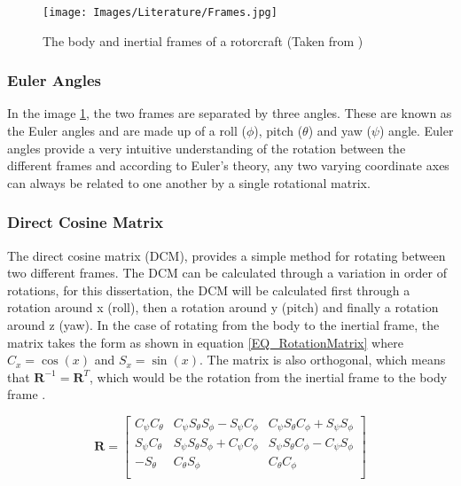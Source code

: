 		\begin{figure}[H]
			\centering
			\texttt{[image: Images/Literature/Frames.jpg]}     
			\caption{The body and inertial frames of a rotorcraft (Taken from \cite{Luukkonen})}
			\label{IM_Frames}
		\end{figure}
			
		\subsubsection{Euler Angles}	
		In the image \ref{IM_Frames}, the two frames are separated by three angles. These are known as the Euler angles and are made up of a roll ($\phi$), pitch ($\theta$) and yaw ($\psi$) angle. Euler angles provide a very intuitive understanding of the rotation between the different frames and according to Euler's theory, any two varying coordinate axes can always be related to one another by a single rotational matrix.
			
		\subsubsection{Direct Cosine Matrix}
		The direct cosine matrix (DCM), provides a simple method for rotating between two different frames. The DCM can be calculated through a variation in order of rotations, for this dissertation, the DCM will be calculated first through a rotation around x (roll), then a rotation around y (pitch) and finally a rotation around z (yaw). In the case of rotating from the body to the inertial frame, the matrix takes the form as shown in equation \eqref{EQ_RotationMatrix} \cite{Luukkonen} where $C_x = \cos(x)$ and $S_x = \sin(x)$. The matrix is also orthogonal, which means that $\textbf{R}^{-1} = \textbf{R}^T$, which would be the rotation from the inertial frame to the body frame \cite{Luukkonen, MiniFlying}.
		
		\begin{equation}
		\label{EQ_RotationMatrix}
		\textbf{R} = 
		\begin{bmatrix}
		C_\psi C_\theta   	& C_\psi S_\theta S_\phi - S_\psi C_\phi & C_\psi S_\theta C_\phi + S_\psi S_\phi \\
		S_\psi C_\theta   	& S_\psi S_\theta S_\phi + C_\psi C_\phi & S_\psi S_\theta C_\phi - C_\psi S_\phi\\
		-S_\theta   		& C_\theta S_\phi & C_\theta C_\phi  \\
		\end{bmatrix}
		\end{equation}
		
